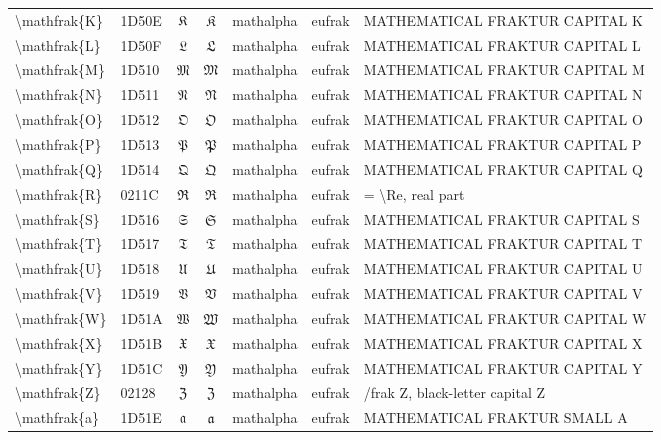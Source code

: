 \documentclass[a4paper,landscape]{article}
\begin{document}
\begin{longtable}{llcclll}
\textbackslash{}mathfrak\{K\} & 1D50E & 𝔎 & $\mathfrak{K}$ & mathalpha & eufrak & MATHEMATICAL FRAKTUR CAPITAL K \\
\textbackslash{}mathfrak\{L\} & 1D50F & 𝔏 & $\mathfrak{L}$ & mathalpha & eufrak & MATHEMATICAL FRAKTUR CAPITAL L \\
\textbackslash{}mathfrak\{M\} & 1D510 & 𝔐 & $\mathfrak{M}$ & mathalpha & eufrak & MATHEMATICAL FRAKTUR CAPITAL M \\
\textbackslash{}mathfrak\{N\} & 1D511 & 𝔑 & $\mathfrak{N}$ & mathalpha & eufrak & MATHEMATICAL FRAKTUR CAPITAL N \\
\textbackslash{}mathfrak\{O\} & 1D512 & 𝔒 & $\mathfrak{O}$ & mathalpha & eufrak & MATHEMATICAL FRAKTUR CAPITAL O \\
\textbackslash{}mathfrak\{P\} & 1D513 & 𝔓 & $\mathfrak{P}$ & mathalpha & eufrak & MATHEMATICAL FRAKTUR CAPITAL P \\
\textbackslash{}mathfrak\{Q\} & 1D514 & 𝔔 & $\mathfrak{Q}$ & mathalpha & eufrak & MATHEMATICAL FRAKTUR CAPITAL Q \\
\textbackslash{}mathfrak\{R\} & 0211C & ℜ & $\mathfrak{R}$ & mathalpha & eufrak & = \textbackslash{}Re,  real part \\
\textbackslash{}mathfrak\{S\} & 1D516 & 𝔖 & $\mathfrak{S}$ & mathalpha & eufrak & MATHEMATICAL FRAKTUR CAPITAL S \\
\textbackslash{}mathfrak\{T\} & 1D517 & 𝔗 & $\mathfrak{T}$ & mathalpha & eufrak & MATHEMATICAL FRAKTUR CAPITAL T \\
\textbackslash{}mathfrak\{U\} & 1D518 & 𝔘 & $\mathfrak{U}$ & mathalpha & eufrak & MATHEMATICAL FRAKTUR CAPITAL U \\
\textbackslash{}mathfrak\{V\} & 1D519 & 𝔙 & $\mathfrak{V}$ & mathalpha & eufrak & MATHEMATICAL FRAKTUR CAPITAL V \\
\textbackslash{}mathfrak\{W\} & 1D51A & 𝔚 & $\mathfrak{W}$ & mathalpha & eufrak & MATHEMATICAL FRAKTUR CAPITAL W \\
\textbackslash{}mathfrak\{X\} & 1D51B & 𝔛 & $\mathfrak{X}$ & mathalpha & eufrak & MATHEMATICAL FRAKTUR CAPITAL X \\
\textbackslash{}mathfrak\{Y\} & 1D51C & 𝔜 & $\mathfrak{Y}$ & mathalpha & eufrak & MATHEMATICAL FRAKTUR CAPITAL Y \\
\textbackslash{}mathfrak\{Z\} & 02128 & ℨ & $\mathfrak{Z}$ & mathalpha & eufrak & /frak Z, black-letter capital Z \\
\textbackslash{}mathfrak\{a\} & 1D51E & 𝔞 & $\mathfrak{a}$ & mathalpha & eufrak & MATHEMATICAL FRAKTUR SMALL A \\

\end{longtable}
\end{document}

